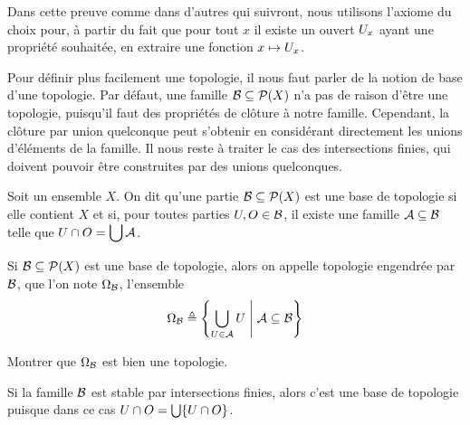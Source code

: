 \begin{remark}
  Dans cette preuve comme dans d'autres qui suivront, nous utilisons l'axiome du
  choix pour, à partir du fait que pour tout $x$ il existe un ouvert $U_x$
  ayant une propriété souhaitée, en extraire une fonction $x \mapsto U_x$.
\end{remark}

Pour définir plus facilement une topologie, il nous faut parler de la notion de
base d'une topologie. Par défaut, une famille $\mathcal B\subseteq\mathcal{P}(X)$
n'a pas de raison d'être une topologie, puisqu'il faut des propriétés de clôture
à notre famille. Cependant, la clôture par union quelconque peut s'obtenir en
considérant directement les unions d'éléments de la famille. Il nous reste à
traiter le cas des intersections finies, qui doivent pouvoir être construites
par des unions quelconques.

\begin{definition}
  Soit un ensemble $X$. On dit qu'une partie $\mathcal B\subseteq\mathcal{P}(X)$
  est une base de topologie si elle contient $X$ et si, pour toutes parties
  $U,O\in \mathcal B$, il existe une famille
  $\mathcal A \subseteq \mathcal B$ telle que
  $\displaystyle U \cap O = \bigcup \mathcal A$.

  Si $\mathcal B\subseteq\mathcal{P}(X)$ est une base de topologie, alors on
  appelle topologie engendrée par $\mathcal B$, que l'on note
  $\Omega_{\mathcal B}$, l'ensemble
  \[\Omega_{\mathcal B} \triangleq
  \left\{ \bigcup_{U \in \mathcal A} U \;\middle\vert\; \mathcal A\subseteq \mathcal B \right\}\]
\end{definition}

\begin{exercise}
  Montrer que $\Omega_{\mathcal B}$ est bien une topologie.
\end{exercise}

\begin{remark}
  Si la famille $\mathcal B$ est stable par intersections finies, alors c'est
  une base de topologie puisque dans ce cas
  $U \cap O = \bigcup \{U \cap O\}$.
\end{remark}

